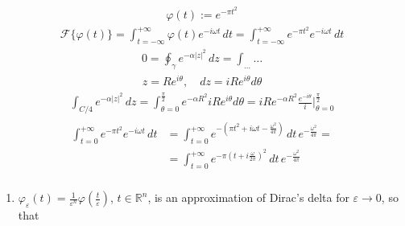 \documentclass[letterpaper,10pt,english]{jupyterBook}
\begin{document}
\begin{equation*}
\begin{split}\varphi(t):= e^{-\pi t^2}\end{split}
\end{equation*}\begin{equation*}
\begin{split}
\mathscr{F}\{ \varphi(t) \} 
 = \int_{t=-\infty}^{+\infty} \varphi(t) e^{-i \omega t} \, dt 
 = \int_{t=-\infty}^{+\infty} e^{-\pi t^2} e^{-i \omega t} \, dt 
\end{split}
\end{equation*}\begin{equation*}
\begin{split}0 = \oint_{\gamma} e^{-\alpha |z|^2} \, dz = \int_{\dots} \dots\end{split}
\end{equation*}\begin{equation*}
\begin{split}z = R e^{i \theta}, \quad dz = i R e^{i \theta} d \theta\end{split}
\end{equation*}\begin{equation*}
\begin{split}\int_{C/4} e^{-\alpha |z|^2} \, dz = \int_{\theta=0}^{\frac{\pi}{2}} e^{-\alpha R^2} i R e^{i\theta} d \theta = i R e^{-\alpha R^2 } \frac{e^{-i \theta}}{i}|_{\theta= 0}^{\frac{\pi}{2}}\end{split}
\end{equation*}\begin{equation*}
\begin{split}\begin{aligned}
  \int_{t=0}^{+\infty} e^{-\pi t^2} e^{-i \omega t} \, dt 
  & = \int_{t=0}^{+\infty} e^{-\left( \pi t^2 + i \omega t - \frac{\omega^2}{4 \pi} \right)} \, dt \, e^{-\frac{\omega^2}{4 \pi}} = \\
  & = \int_{t=0}^{+\infty} e^{-\pi \left( t + i \frac{\omega}{2 \pi} \right)^2} \, dt \, e^{-\frac{\omega^2}{4 \pi}} \\
\end{aligned}\end{split}
\end{equation*}\begin{enumerate}
%
\setcounter{enumi}{4}
\item {} 
\sphinxAtStartPar
\(\varphi_{\varepsilon}(t) = \frac{1}{\varepsilon^n} \varphi\left( \frac{t}{\varepsilon} \right)\), \(t \in \mathbb{R}^n\), is an approximation of Dirac’s delta for \(\varepsilon \rightarrow 0\), so that

\end{enumerate}
\end{document}
